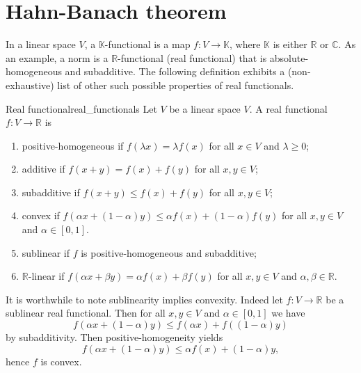 \section{Hahn-Banach theorem}
In a linear space \(V\), a \(\mathbb{K}\)-functional is a map \(f : V \to \mathbb{K}\), where \(\mathbb{K}\) is either \(\mathbb{R}\) or \(\mathbb{C}\). As an example, a norm is a \(\mathbb{R}\)-functional (real functional) that is absolute-homogeneous and subadditive. The following definition exhibits a (non-exhaustive) list of other such possible properties of real functionals.
\begin{definition}{Real functional}{real_functionals}
    Let \(V\) be a linear space \(V\). A real functional \(f : V \to \mathbb{R}\) is
    \begin{enumerate}[label=(\alph*)]
        \item positive-homogeneous if \(f(\lambda x) = \lambda f(x)\) for all \(x \in V\) and \(\lambda \geq 0\);
        \item additive if \(f(x + y) = f(x) + f(y)\) for all \(x,y \in V\);
        \item subadditive if \(f(x + y) \leq f(x) + f(y)\) for all \(x,y \in V\);
        \item convex if \(f(\alpha x + (1 - \alpha)y) \leq \alpha f(x) + (1-\alpha)f(y)\) for all \(x,y \in V\) and \(\alpha \in [0,1]\).
        \item sublinear if \(f\) is positive-homogeneous and subadditive;
        \item \(\mathbb{R}\)-linear if \(f(\alpha x + \beta y) = \alpha f(x) + \beta f(y)\) for all \(x,y \in V\) and \(\alpha, \beta \in \mathbb{R}\).
    \end{enumerate}
\end{definition}
\begin{remark}
    It is worthwhile to note sublinearity implies convexity. Indeed let \(f : V \to \mathbb{R}\) be a sublinear real functional. Then for all \(x,y \in V\) and \(\alpha \in [0,1]\) we have
    \begin{equation*}
        f(\alpha x + (1-\alpha)y) \leq f(\alpha x) + f((1 - \alpha)y)
    \end{equation*}
    by subadditivity. Then positive-homogeneity yields
    \begin{equation*}
        f(\alpha x + (1-\alpha)y) \leq \alpha f(x) + (1-\alpha)y,
    \end{equation*}
    hence \(f\) is convex.
\end{remark}

